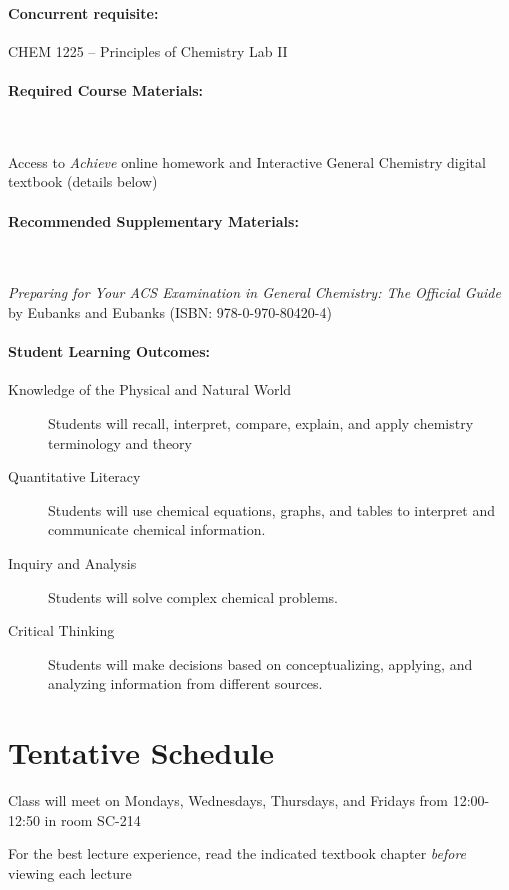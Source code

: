 \documentclass[12pt, letterpaper]{article}
\begin{document}
\paragraph{Concurrent requisite:}
CHEM 1225 -- Principles of Chemistry Lab II

\paragraph{Required Course Materials:} ~

Access to \emph{Achieve} online homework and Interactive General Chemistry digital textbook (details below)

\paragraph{Recommended Supplementary Materials:} ~

\emph{Preparing for Your ACS Examination in General Chemistry: The Official Guide} by Eubanks and Eubanks (ISBN: 978-0-970-80420-4)

\paragraph{Student Learning Outcomes:}
\begin{description}
  \item[Knowledge of the Physical and Natural World] Students will recall, interpret, compare, explain, and apply chemistry terminology and theory
  \item[Quantitative Literacy] Students will use chemical equations, graphs, and tables to interpret and communicate chemical information.
  \item[Inquiry and Analysis] Students will solve complex chemical problems.
  \item[Critical Thinking] Students will make decisions based on conceptualizing, applying, and analyzing information from different sources.
\end{description}

\section*{Tentative Schedule}
Class will meet on Mondays, Wednesdays, Thursdays, and Fridays from 12:00-12:50 in room SC-214

\noindent For the best lecture experience, read the indicated textbook chapter \emph{before} viewing each lecture
\end{document}

